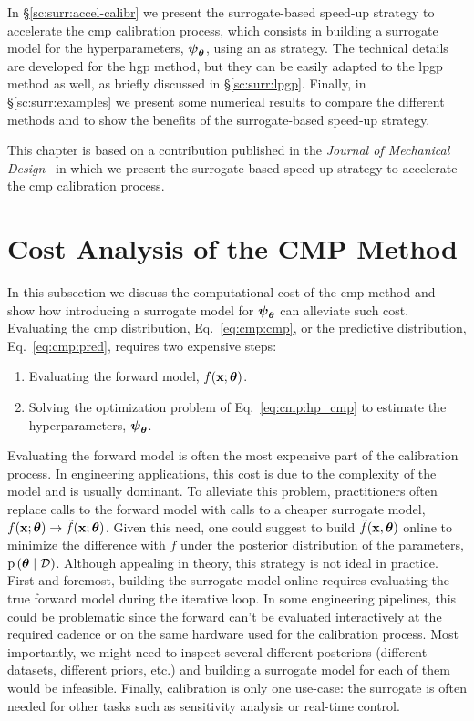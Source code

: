 In \S\ref{sc:surr:accel-calibr} we present the surrogate-based speed-up strategy to accelerate the \gls{cmp} calibration process, which consists in building a surrogate model for the hyperparameters, $\boldsymbol{\psi}_{\boldsymbol{\theta}}$, using an \gls{as} strategy. The technical details are developed for the \gls{hgp} method, but they can be easily adapted to the \gls{lpgp} method as well, as briefly discussed in \S\ref{sc:surr:lpgp}. Finally, in \S\ref{sc:surr:examples} we present some numerical results to compare the different methods and to show the benefits of the surrogate-based speed-up strategy.

\smallskip
This chapter is based on a contribution published in the \textit{Journal of Mechanical Design}~\cite{surr} in which we present the surrogate-based speed-up strategy to accelerate the \gls{cmp} calibration process. 

\section{Cost Analysis of the CMP Method}
\label{sec:surr:perf-cmp-calbr}

In this subsection we discuss the computational cost of the \gls{cmp} method and show how introducing a surrogate model for $\boldsymbol{\psi}_{\boldsymbol{\theta}}$ can alleviate such cost. Evaluating the \gls{cmp} distribution, Eq.~\eqref{eq:cmp:cmp}, or the predictive distribution, Eq.~\eqref{eq:cmp:pred}, requires two expensive steps:

\begin{enumerate}
  \item Evaluating the forward model, $f(\mathbf{x}; \boldsymbol{\theta})$.
  \item Solving the optimization problem of Eq.~\eqref{eq:cmp:hp_cmp} to estimate the hyperparameters, $\boldsymbol{\psi}_{\boldsymbol{\theta}}$.
\end{enumerate}

Evaluating the forward model is often the most expensive part of the calibration process. In engineering applications, this cost is due to the complexity of the model and is usually dominant. To alleviate this problem, practitioners often replace calls to the forward model with calls to a cheaper surrogate model, $f(\mathbf{x}; \boldsymbol{\theta}) \rightarrow \tilde{f}(\mathbf{x}; \boldsymbol{\theta})$. Given this need, one could suggest to build $\tilde{f}(\mathbf{x}, \boldsymbol{\theta})$ online to minimize the difference with $f$ under the posterior distribution of the parameters, $\mathrm{p} \left( \boldsymbol{\theta} \mid \mathcal{D} \right)$. Although appealing in theory, this strategy is not ideal in practice. First and foremost, building the surrogate model online requires evaluating the true forward model during the iterative loop. In some engineering pipelines, this could be problematic since the forward can't be evaluated interactively at the required cadence or on the same hardware used for the calibration process. Most importantly, we might need to inspect several different posteriors (different datasets, different priors, etc.) and building a surrogate model for each of them would be infeasible. Finally, calibration is only one use-case: the surrogate is often needed for other tasks such as sensitivity analysis or real-time control. 

